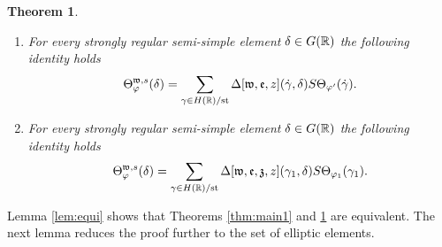 \documentclass{article}
\newtheorem{thm}{Theorem}[subsection]
\theoremstyle{definition}
\numberwithin{equation}{section}
\renewcommand{\-}{\hyp{}}
\begin{document}
\begin{thm} \label{thm:main2}
\begin{enumerate}
	\item For every strongly regular semi-simple element $\delta \in G(\mathbb{R})$ the following identity holds
	\[ \Theta_\varphi^{\mathfrak{w},s}(\delta) = \sum_{\gamma \in H(\mathbb{R})/\textrm{st}} \Delta[\mathfrak{w},\mathfrak{e},z](\dot\gamma,\delta)S\Theta_{\varphi'}(\dot\gamma). \]
	\item For every strongly regular semi-simple element $\delta \in G(\mathbb{R})$ the following identity holds
	\[ \Theta_\varphi^{\mathfrak{w},s}(\delta) = \sum_{\gamma \in H(\mathbb{R})/\textrm{st}} \Delta[\mathfrak{w},\mathfrak{e},\mathfrak{z},z](\gamma_1,\delta)S\Theta_{\varphi_1}(\gamma_1). \]
\end{enumerate}
\end{thm}

Lemma \ref{lem:equi} shows that Theorems \ref{thm:main1} and \ref{thm:main2} are equivalent. The next lemma reduces the proof further to the set of elliptic elements.
\end{document}
